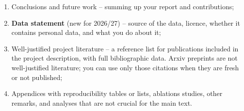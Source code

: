 \documentclass[11pt]{article}
\begin{document}
\begin{enumerate}
\item Conclusions and future work -- summing up your report and contributions;
\item \textbf{Data statement} (new for 2026/27) -- source of the data, licence, whether it contains personal data, and what you do about it;
\item Well-justified project literature -- a reference list for publications included in the project description, with full bibliographic data. Arxiv preprints are not well-justified literature; you can use only those citations when they are fresh or not published;
\item Appendices with reproducibility tables or lists, ablations studies, other remarks, and analyses that are not crucial for the main text.
\end{enumerate}

%
%
\end{document}
